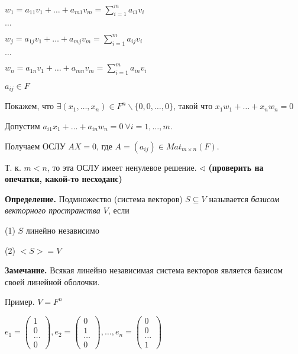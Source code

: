 $w_1 = a_{11}v_1 + \dots + a_{m1} v_m = \sum\limits_{i = 1}^m a_{i1} v_i$

$\dots$

$w_j = a_{1j}v_1 + \dots + a_{mj} v_m = \sum\limits_{i = 1}^m a_{ij} v_i$

$\dots$

$w_n = a_{1n}v_1 + \dots + a_{mn} v_m = \sum\limits_{i = 1}^m a_{in} v_i$

$a_{ij} \in F$

\vspace{\baselineskip}
Покажем, что $\exists (x_1, \dots, x_n) \in F^n \backslash \{0, 0, \dots, 0\}$, такой что $x_1 w_1 + \dots + x_n w_n = 0$

Допустим $a_{i1} x_1 + \dots + a_{in} w_n = 0 \ \forall i = 1, \dots, m$.

Получаем ОСЛУ $AX = 0$, где $A = (a_{ij}) \in Mat_{m \times n} (F)$.

Т. к. $m < n$, то эта ОСЛУ имеет ненулевое решение. $\lhd$
\textbf{(проверить на опечатки, какой-то несходанс)}

\vspace{\baselineskip}
\textbf{Определение.} Подмножество (система векторов) $S \subseteq V$ называется \textit{базисом векторного пространства $V$}, если 

(1) $S$ линейно независимо

(2) $<S> = V$

\vspace{\baselineskip}
\textbf{Замечание.} Всякая линейно независимая система векторов является базисом своей линейной оболочки.

\vspace{\baselineskip}
Пример. $V = F^n$

$e_1 = \begin{pmatrix} 1 \\ 0 \\ \dots \\ 0  \end{pmatrix}, e_2 = \begin{pmatrix} 0 \\ 1 \\ \dots \\ 0  \end{pmatrix}, \dots, e_n = \begin{pmatrix} 0 \\ 0 \\ \dots \\ 1 \end{pmatrix}$

